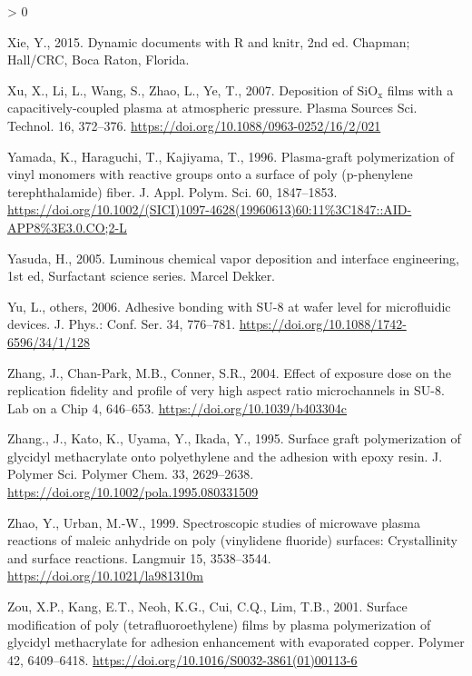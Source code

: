 \documentclass[
  11pt,
  twoside]{article}
\newlength{\cslhangindent}
\newenvironment{CSLReferences}[2] %
 {%
  \setlength{\parindent}{0pt}
  \ifodd #1 \everypar{\setlength{\hangindent}{\cslhangindent}}\ignorespaces\fi
  \ifnum #2 > 0
  \setlength{\parskip}{#2\baselineskip}
  \fi
 }%
 {}
\begin{document}
\begin{CSLReferences}{1}{0}
\leavevmode\hypertarget{ref-xie2015}{}%
Xie, Y., 2015. Dynamic documents with {R} and knitr, 2nd ed. Chapman; Hall/CRC, Boca Raton, Florida.

\leavevmode\hypertarget{ref-Xu07}{}%
Xu, X., Li, L., Wang, S., Zhao, L., Ye, T., 2007. Deposition of \(\mathrm{SiO_x}\) films with a capacitively-coupled plasma at atmospheric pressure. Plasma Sources Sci. Technol. 16, 372--376. \url{https://doi.org/10.1088/0963-0252/16/2/021}

\leavevmode\hypertarget{ref-Yama1996}{}%
Yamada, K., Haraguchi, T., Kajiyama, T., 1996. Plasma-graft polymerization of vinyl monomers with reactive groups onto a surface of poly (p-phenylene terephthalamide) fiber. J. Appl. Polym. Sci. 60, 1847--1853. \url{https://doi.org/10.1002/(SICI)1097-4628(19960613)60:11\%3C1847::AID-APP8\%3E3.0.CO;2-L}

\leavevmode\hypertarget{ref-Yasu05}{}%
Yasuda, H., 2005. Luminous chemical vapor deposition and interface engineering, 1st ed, Surfactant science series. Marcel Dekker.

\leavevmode\hypertarget{ref-Yu06}{}%
Yu, L., others, 2006. Adhesive bonding with SU-8 at wafer level for microfluidic devices. J. Phys.: Conf. Ser. 34, 776--781. \url{https://doi.org/10.1088/1742-6596/34/1/128}

\leavevmode\hypertarget{ref-Zhan04}{}%
Zhang, J., Chan-Park, M.B., Conner, S.R., 2004. Effect of exposure dose on the replication fidelity and profile of very high aspect ratio microchannels in {SU-8}. Lab on a Chip 4, 646--653. \url{https://doi.org/10.1039/b403304c}

\leavevmode\hypertarget{ref-Zhan1995}{}%
Zhang., J., Kato, K., Uyama, Y., Ikada, Y., 1995. Surface graft polymerization of glycidyl methacrylate onto polyethylene and the adhesion with epoxy resin. J. Polymer Sci. Polymer Chem. 33, 2629--2638. \url{https://doi.org/10.1002/pola.1995.080331509}

\leavevmode\hypertarget{ref-Zhao1999}{}%
Zhao, Y., Urban, M.-W., 1999. Spectroscopic studies of microwave plasma reactions of maleic anhydride on poly (vinylidene fluoride) surfaces: Crystallinity and surface reactions. Langmuir 15, 3538--3544. \url{https://doi.org/10.1021/la981310m}

\leavevmode\hypertarget{ref-Zou01}{}%
Zou, X.P., Kang, E.T., Neoh, K.G., Cui, C.Q., Lim, T.B., 2001. Surface modification of poly (tetrafluoroethylene) films by plasma polymerization of glycidyl methacrylate for adhesion enhancement with evaporated copper. Polymer 42, 6409--6418. \url{https://doi.org/10.1016/S0032-3861(01)00113-6}

\end{CSLReferences}
\end{document}
